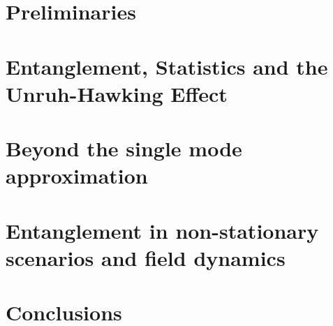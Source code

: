 \documentclass[12pt,a4paper,twoside,nofootinbib,british]{book}
\numberwithin{equation}{section}
\begin{document}
\thispagestyle{empty}







%

\setcounter{page}{1}
\thispagestyle{empty}
\tableofcontents

\newpage

%





\part*{Preliminaries}




\part[Entanglement, statistics and the Unruh-Hawking effect]{Entanglement, Statistics and the Unruh-Hawking Effect}
\label{part1}











\part[Beyond the single mode approximation]{Beyond the single mode approximation}
\label{part2}










\part[Non-stationary spacetimes and field dynamics]{Entanglement in non-stationary scenarios and field dynamics}
\label{part3}







\part*{Conclusions}



\appendix






\end{document}
